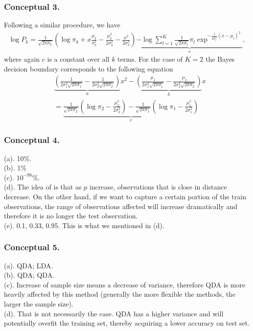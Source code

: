 \subsubsection{Conceptual 3.}
Following a similar procedure, we have
\begin{align*}
\log P_k = \frac{1}{\sqrt{2\pi\sigma_k}}(\log \pi_k + x\frac{\mu_k}{\sigma_k^2} -\frac{\mu_k^2}{2\sigma_k^2} - \frac{x^2}{2\sigma_k^2}) \underbrace{ - \log\sum_{l=1}^{K}\frac{1}{\sqrt{2\pi\sigma_l}}\pi_l\exp^{-\frac{1}{2\sigma_l^2}(x-\mu_l)^2}}_c,
\end{align*}
where again $c$ is a constant over all $k$ terms. For the case of $K=2$ the Bayes decision boundary corresponds to the following equation
\begin{align*}
&\underbrace{(\frac{1}{2\sigma_1^2\sqrt{2\pi\sigma_1}} -\frac{1}{2\sigma_2^2\sqrt{2\pi\sigma_2}})}_ax^2 - \underbrace{(\frac{\mu_1}{2\sigma_1^2\sqrt{2\pi\sigma_1}} -\frac{\mu_2}{2\sigma_2^2\sqrt{2\pi\sigma_2}})}_bx  \\
 &= \underbrace{\frac{1}{\sqrt{2\pi\sigma_2}}(\log \pi_2 - \frac{\mu_2^2}{2\sigma_2^2}) - \frac{1}{\sqrt{2\pi\sigma_1}}(\log \pi_1- \frac{\mu_1^2}{2\sigma_1^2})}_c
\end{align*}
\subsubsection{Conceptual 4.}
(a). 10\%.\\
(b). 1\%\\
(c). $10^{-98}\%$. \\
(d). The idea of  is that as $p$ increase, observations that is close in distance decrease. On the other hand, if we want to capture a certain portion of the train observations, the range of observations affected will increase dramatically and therefore it is no longer  the test observation. \\
(e). 0.1, 0.33, 0.95. This is what we mentioned in (d).
\subsubsection{Conceptual 5.}
(a). QDA; LDA. \\
(b). QDA; QDA. \\
(c). Increase of sample size means a decrease of variance, therefore QDA is more heavily affected by this method (generally the more flexible the methods, the larger the sample size).\\
(d). That is not necessarily the case. QDA has a higher variance and will potentially overfit the training set, thereby acquiring a lower accuracy on test set.
